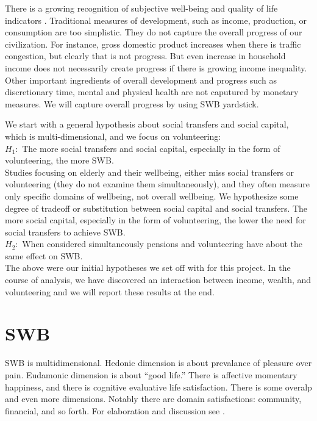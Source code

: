 \documentclass[10pt, letterpaper]{article}
\begin{document}
\begin{spacing}{1.4}
There is a growing recognition of subjective  well-being and quality of life
indicators \citep{aok_lsPol16}. Traditional
measures of development, such as income, production, or consumption are too
simplistic. They do not capture the overall progress of our civilization. For
instance, gross domestic product increases when there is traffic congestion, but
clearly that is not 
progress. But even increase in household income does not necessarily
 create progress if there is growing income inequality. 
Other important ingredients of overall development and progress such as
discretionary time, mental and physical health are not caputured by monetary measures. We will
capture overall progress by using SWB yardstick.

%
 We start with a general hypothesis about social
 transfers and social capital, which is multi-dimensional, and we focus  on volunteering:\\
\noindent$H_1:$ The more social transfers and social capital, especially in the
form of volunteering, the more SWB.\\

Studies focusing on elderly and their wellbeing, either miss social
transfers or volunteering (they do not examine them simultaneously), and they
often measure only specific domains of wellbeing, not overall wellbeing. We
hypothesize some degree of tradeoff or substitution between social capital and
social transfers. The more social capital, especially in the form of volunteering,
the lower the need for social transfers to achieve SWB.\\ 

\noindent$H_2:$ When considered simultaneously pensions and volunteering have about the same effect on SWB.\\ 

The above were our initial hypotheses we set off with for this project. In the
course of analysis, we have discovered an interaction between income, wealth, and
volunteering and we will report these results at the end. 

\section{SWB} 

SWB is multidimensional. Hedonic dimension is about prevalance of pleasure over
pain. Eudamonic dimension is about ``good life.'' There is affective momentary
happiness, and there is cognitive evaluative life satisfaction. There is some
overalp and even more dimensions. Notably there are domain satisfactions:
community, financial, and so forth. For elaboration and discussion see \citet{diener09,diener04s,veenhoven08,kahneman99,campbell76etal}.


\end{spacing}
\end{document}
